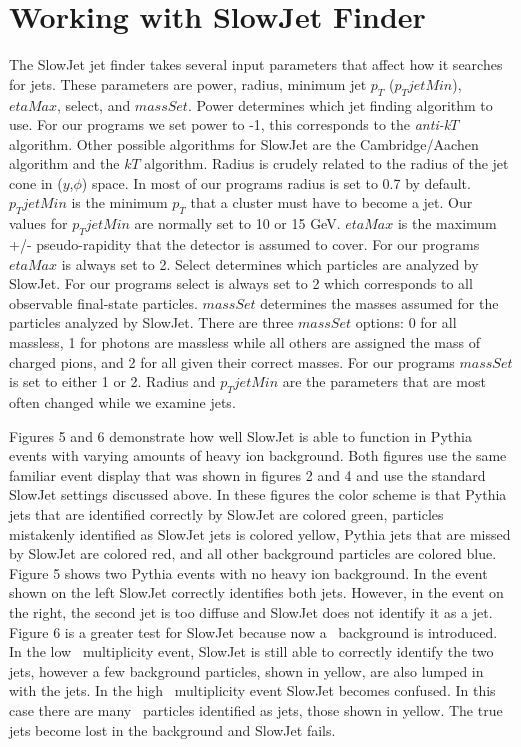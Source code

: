 \documentclass[11pt]{article}
\begin{document}
\section{Working with SlowJet Finder}
%
%
The SlowJet jet finder takes several input parameters that affect how it searches for jets. These parameters are power, radius, minimum jet $p_T$ ($p_TjetMin$), $etaMax$, select, and $massSet$. Power determines which jet finding algorithm to use. For our programs we set power to -1, this corresponds to the {\it anti-k$T$} algorithm. Other possible algorithms for SlowJet are the Cambridge/Aachen algorithm and the $kT$ algorithm. Radius is crudely related to the radius of the jet cone in ($y$,$\phi$) space. In most of our programs radius is set to 0.7 by default. $p_TjetMin$ is the minimum $p_T$ that a cluster must have to become a jet. Our values for $p_TjetMin$ are normally set to 10 or 15 GeV. $etaMax$ is the maximum +/- pseudo-rapidity that the detector is assumed to cover. For our programs $etaMax$ is always set to 2. Select determines which particles are analyzed by SlowJet. For our programs select is always set to 2 which corresponds to all observable final-state particles. $massSet$ determines the masses assumed for the particles analyzed by SlowJet. There are three $massSet$ options: 0 for all massless, 1 for photons are massless while all others are assigned the mass of charged pions, and 2 for all given their correct masses. For our programs $massSet$ is set to either 1 or 2. Radius and $p_TjetMin$ are the parameters that are most often changed while we examine jets.

Figures 5 and 6 demonstrate how well SlowJet is able to function in Pythia events with varying amounts of heavy ion background. Both figures use the same familiar event display that was shown in figures 2 and 4 and use the standard SlowJet settings discussed above. In these figures the color scheme is that Pythia jets that are identified correctly by SlowJet are colored green, particles mistakenly identified as SlowJet jets is colored yellow,  Pythia jets that are missed by SlowJet are colored red, and all other background particles are colored blue. Figure 5 shows two Pythia events with no heavy ion background. In the event shown on the left SlowJet correctly identifies both jets. However, in the event on the right, the second jet is too diffuse and SlowJet does not identify it as a jet. Figure 6 is a greater test for SlowJet because now a \trento\ background is introduced. In the low \trento\ multiplicity event, SlowJet is still able to correctly identify the two jets, however a few background particles, shown in yellow, are also lumped in with the jets.  In the high \trento\ multiplicity event SlowJet becomes confused. In this case there are many \trento\ particles identified as jets, those shown in yellow. The true jets become lost in the background and SlowJet fails.
\end{document}
